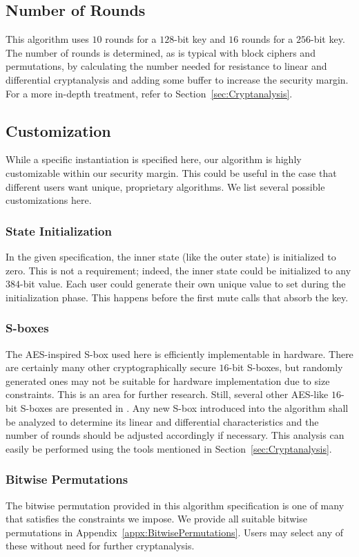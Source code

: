 \subsection{Number of Rounds}
This algorithm uses $10$ rounds for a $128$-bit key and $16$ rounds for a $256$-bit key.
The number of rounds is determined, as is typical with block ciphers and permutations, by calculating the number needed for resistance to linear and differential cryptanalysis and adding some buffer to increase the security margin. 
For a more in-depth treatment, refer to Section~\ref{sec:Cryptanalysis}.

\subsection{Customization}
While a specific instantiation is specified here, our algorithm is highly customizable within our security margin.
This could be useful in the case that different users want unique, proprietary algorithms.
We list several possible customizations here.

\subsubsection{State Initialization}
In the given specification, the inner state (like the outer state) is initialized to zero.
This is not a requirement; indeed, the inner state could be initialized to any $384$-bit value.
Each user could generate their own unique value to set during the initialization phase.
This happens before the first mute calls that absorb the key.

\subsubsection{S-boxes}
The AES-inspired S-box used here is efficiently implementable in hardware.
There are certainly many other cryptographically secure $16$-bit S-boxes, but randomly generated ones may not be suitable for hardware implementation due to size constraints.
This is an area for further research.
Still, several other AES-like $16$-bit S-boxes are presented in \cite{Wood2013_SboxThesis}.
Any new S-box introduced into the algorithm shall be analyzed to determine its linear and differential characteristics and the number of rounds should be adjusted accordingly if necessary.
This analysis can easily be performed using the tools mentioned in Section~\ref{sec:Cryptanalysis}.

\subsubsection{Bitwise Permutations}
The bitwise permutation provided in this algorithm specification is one of many that satisfies the constraints we impose.
We provide all suitable bitwise permutations in Appendix~\ref{appx:BitwisePermutations}.
Users may select any of these without need for further cryptanalysis.


